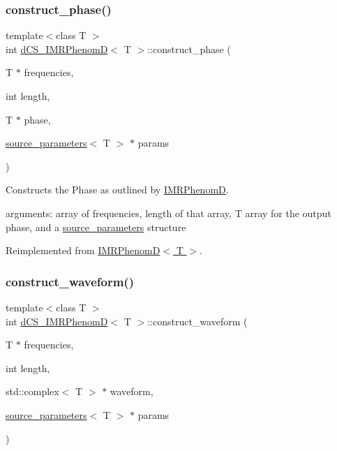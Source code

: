 \subsubsection{\texorpdfstring{construct\+\_\+phase()}{construct\_phase()}}
{\footnotesize\ttfamily template$<$class T $>$ \\
int \hyperlink{classdCS__IMRPhenomD}{d\+C\+S\+\_\+\+I\+M\+R\+PhenomD}$<$ T $>$\+::construct\+\_\+phase (\begin{DoxyParamCaption}\item[{T $\ast$}]{frequencies,  }\item[{int}]{length,  }\item[{T $\ast$}]{phase,  }\item[{\hyperlink{structsource__parameters}{source\+\_\+parameters}$<$ T $>$ $\ast$}]{params }\end{DoxyParamCaption})\hspace{0.3cm}{\ttfamily [virtual]}}



Constructs the Phase as outlined by \hyperlink{classIMRPhenomD}{I\+M\+R\+PhenomD}. 

arguments\+: array of frequencies, length of that array, T array for the output phase, and a \hyperlink{structsource__parameters}{source\+\_\+parameters} structure 

Reimplemented from \hyperlink{classIMRPhenomD_abcbaafd0dc4086d2abe1f5ce256908c2}{I\+M\+R\+Phenom\+D$<$ T $>$}.

\mbox{\label{classdCS__IMRPhenomD_ad6fa19d2181da900203c2bf1e182a60b}} 
\subsubsection{\texorpdfstring{construct\+\_\+waveform()}{construct\_waveform()}}
{\footnotesize\ttfamily template$<$class T $>$ \\
int \hyperlink{classdCS__IMRPhenomD}{d\+C\+S\+\_\+\+I\+M\+R\+PhenomD}$<$ T $>$\+::construct\+\_\+waveform (\begin{DoxyParamCaption}\item[{T $\ast$}]{frequencies,  }\item[{int}]{length,  }\item[{std\+::complex$<$ T $>$ $\ast$}]{waveform,  }\item[{\hyperlink{structsource__parameters}{source\+\_\+parameters}$<$ T $>$ $\ast$}]{params }\end{DoxyParamCaption})\hspace{0.3cm}{\ttfamily [virtual]}}



